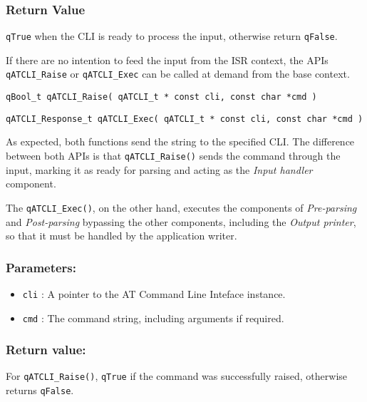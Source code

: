 \subsubsection*{Return Value}
\lstinline{qTrue} when the CLI is ready to process the input, otherwise return \lstinline{qFalse}.

\noindent\hrulefill
\newline
If there are no intention to feed the input from the ISR context, the APIs \lstinline{qATCLI_Raise}  or \lstinline{qATCLI_Exec}  can be called at demand from the base context.
\medskip

\begin{lstlisting}[style=CStyle]
qBool_t qATCLI_Raise( qATCLI_t * const cli, const char *cmd )
\end{lstlisting}

\begin{lstlisting}[style=CStyle]
qATCLI_Response_t qATCLI_Exec( qATCLI_t * const cli, const char *cmd )
\end{lstlisting}

As expected, both functions send the string to the specified CLI.
The difference between both APIs is that \lstinline{qATCLI_Raise()} sends the command through the input, marking it as ready for parsing and acting as the \textit{Input handler} component.

The \lstinline{qATCLI_Exec()}, on the other hand, executes the components of \textit{Pre-parsing} and \textit{Post-parsing} bypassing the other components, including the \textit{Output printer}, so that it must be handled by the application writer.

\subsubsection*{Parameters:}
\begin{itemize}
    \item \lstinline{cli} : A pointer to the AT Command Line Inteface instance.
    \item \lstinline{cmd} : The command string, including arguments if required.
\end{itemize}

\subsubsection*{Return value:}
For \lstinline{qATCLI_Raise()}, \lstinline{qTrue} if the command was successfully raised, otherwise returns \lstinline{qFalse}.

